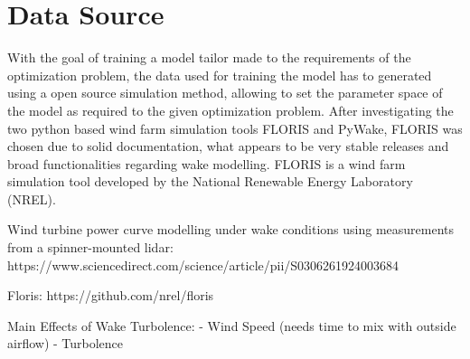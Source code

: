 
\chapter{Data Source}\label{chapter:introduction}

With the goal of training a model tailor made to the requirements of the optimization problem, the data used for training the model has to generated using a open source simulation method, allowing to set the parameter space of the model as required to the given optimization problem. After investigating the two python based wind farm simulation tools FLORIS and PyWake, FLORIS was chosen due to solid documentation, what appears to be very stable releases and broad functionalities regarding wake modelling. FLORIS is a wind farm simulation tool developed by the National Renewable Energy Laboratory (NREL).



Wind turbine power curve modelling under wake conditions using measurements from a spinner-mounted lidar:
https://www.sciencedirect.com/science/article/pii/S0306261924003684

Floris:
https://github.com/nrel/floris



Main Effects of Wake Turbolence: 
- Wind Speed (needs time to mix with outside airflow)
- Turbolence
